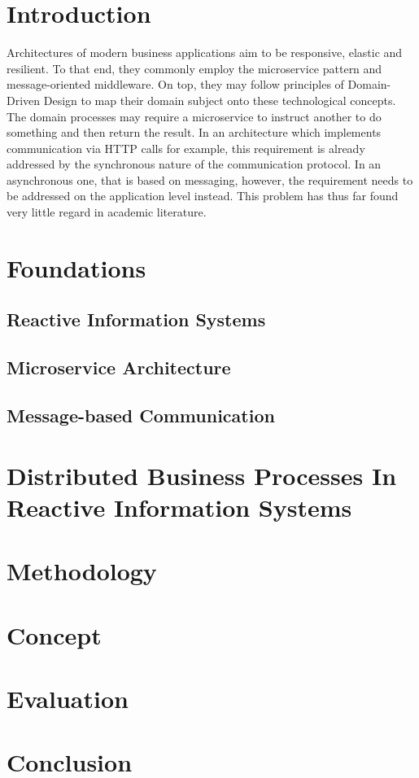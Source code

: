 
\section{Introduction}

Architectures of modern business applications aim to be responsive, elastic and resilient.
To that end, they commonly employ the microservice pattern and message-oriented
middleware.
On top, they may follow principles of Domain-Driven Design to map their domain subject onto these technological concepts.
The domain processes may require a microservice to instruct another to do something and then return the result.
In an architecture which implements communication via HTTP calls for example, this requirement is already addressed by the synchronous nature of the communication protocol.
In an asynchronous one, that is based on messaging, however, the requirement needs to be addressed on the application level instead.
This problem has thus far found very little regard in academic literature.

\section{Foundations}

\subsection{Reactive Information Systems}

\subsection{Microservice Architecture}

\subsection{Message-based Communication}

\section{Distributed Business Processes In Reactive Information Systems}

\section{Methodology}

\section{Concept}

\section{Evaluation}

\section{Conclusion}
